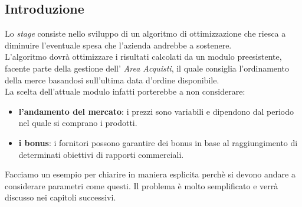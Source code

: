\subsection{Introduzione}

\noindent Lo \textit{stage} consiste nello sviluppo di un algoritmo di ottimizzazione che riesca a diminuire l'eventuale spesa che l'azienda andrebbe
a sostenere.\\
L'algoritmo dovrà ottimizzare i risultati calcolati da un modulo preesistente, facente parte della gestione dell' \textit{Area Acquisti}, il quale
consiglia l'ordinamento della merce basandosi sull'ultima data d'ordine disponibile.\\
\noindent La scelta dell'attuale modulo infatti porterebbe a non considerare:
\begin{itemize}
    \item \textbf{l'andamento del mercato}: i prezzi sono variabili e dipendono dal periodo nel quale si comprano i prodotti.
    \item \textbf{i bonus}: i fornitori possono garantire dei bonus in base al raggiungimento di determinati obiettivi di rapporti commerciali.
\end{itemize}
\noindent Facciamo un esempio per chiarire in maniera esplicita perchè si devono andare a considerare parametri come questi. Il problema
è molto semplificato e verrà discusso nei capitoli successivi.\\

\renewcommand{\arraystretch}{1.2}

